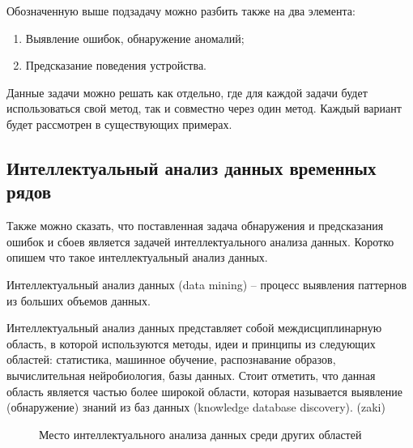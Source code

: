 Обозначенную выше подзадачу можно разбить также на два элемента:

\begin{enumerate}
    \item Выявление ошибок, обнаружение аномалий;
    \item Предсказание поведения устройства.
\end{enumerate}

Данные задачи можно решать как отдельно, где для каждой задачи будет использоваться свой метод,
так и совместно через один метод. Каждый вариант будет рассмотрен в существующих примерах.

\subsection{Интеллектуальный анализ данных временных рядов}

Также можно сказать, что поставленная задача обнаружения и предсказания ошибок и сбоев
является задачей интеллектуального анализа данных. Коротко опишем что такое интеллектуальный анализ данных.

Интеллектуальный анализ данных (data mining) 
-- процесс выявления паттернов из больших объемов данных. \cite{han-mining}

Интеллектуальный анализ данных представляет собой междисциплинарную область,
в которой используются методы, идеи и принципы из следующих областей:
статистика, машинное обучение, распознавание образов,
вычислительная нейробиология, базы данных.
Стоит отметить, что данная область является частью более широкой области, 
которая называется выявление (обнаружение) знаний из баз данных (knowledge database discovery).
(zaki)

\begin{figure}[h]
    \caption{Место интеллектуального анализа данных среди других областей}
\end{figure}

